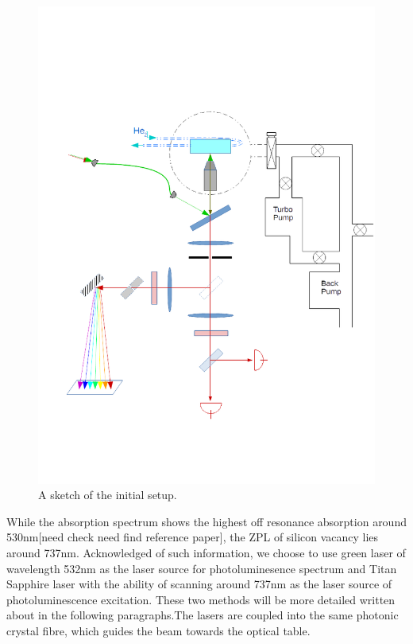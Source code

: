 \begin{figure}[h]
\centering
\includegraphics[width=1\linewidth]{Figures/pic/initialsetup}
\caption{A sketch of the initial setup.}
\label{fig:initialsetup}
\end{figure}

While the absorption spectrum shows the highest off resonance absorption around 530nm[need check need find reference paper], the ZPL of silicon vacancy lies around 737nm. Acknowledged of such information, we choose to use green laser of wavelength 532nm as the laser source for photoluminesence spectrum and Titan Sapphire laser with the ability of scanning around 737nm as the laser source of photoluminescence excitation. These two methods will be more detailed written about in the following paragraphs.The lasers are coupled into the same photonic crystal fibre, which guides the beam towards the optical table.

